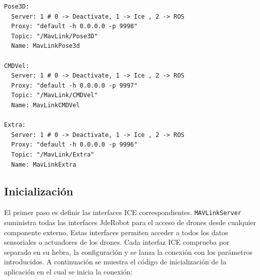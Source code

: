 \begin{lstlisting}[frame=single]
Pose3D:
  Server: 1 # 0 -> Deactivate, 1 -> Ice , 2 -> ROS
  Proxy: "default -h 0.0.0.0 -p 9998"
  Topic: "/MavLink/Pose3D"
  Name: MavLinkPose3d

CMDVel:
  Server: 1 # 0 -> Deactivate, 1 -> Ice , 2 -> ROS
  Proxy: "default -h 0.0.0.0 -p 9997"
  Topic: "/MavLink/CMDVel"
  Name: MavLinkCMDVel

Extra:
  Server: 1 # 0 -> Deactivate, 1 -> Ice , 2 -> ROS
  Proxy: "default -h 0.0.0.0 -p 9996"
  Topic: "/MavLink/Extra"
  Name: MavLinkExtra
\end{lstlisting}

\subsection{Inicialización}

El primer paso es definir las interfaces ICE correspondientes. \texttt{MAVLinkServer} suministra todas las interfaces JdeRobot para el acceso de drones desde cualquier componente externo. Estas interfaces permiten acceder a todos los datos sensoriales o actuadores de los drones. Cada interfaz ICE comprueba por separado en su hebra, la configuración y se lanza la conexión con los parámetros introducidos. A continuación se muestra el código de inicialización de la aplicación en el cual se inicia la conexión:

